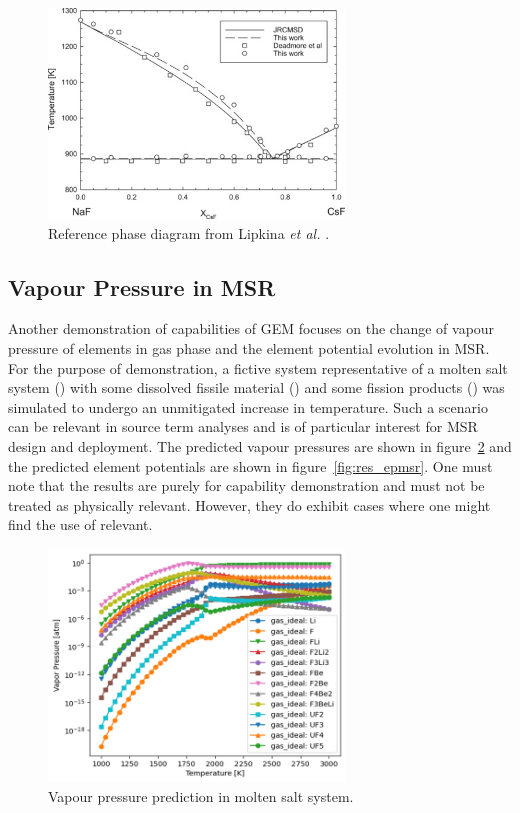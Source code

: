 \begin{figure}
         \centering
         \includegraphics[width=0.7\textwidth]{figures/chapter-7/pdo.png}
         \caption[Reference  phase  diagram from Lipkina \textit{et al.}]{Reference  phase  diagram from Lipkina \textit{et al.} \cite{Lipkina:2022aa}.}
     \label{fig:res_refdia}
\end{figure}
 
\subsection{Vapour Pressure in MSR}
    Another demonstration of capabilities of GEM focuses on the change of vapour pressure of elements in gas phase and the element potential evolution in MSR. For the purpose of demonstration, a fictive system representative of a molten salt system () with some dissolved fissile material () and some fission products () was simulated to undergo an unmitigated increase in temperature. Such a scenario can be relevant in source term analyses and is of particular interest for MSR design and deployment. The predicted vapour pressures are shown in figure~\ref{fig:res_vpmsr} and the predicted element potentials are shown in figure~\ref{fig:res_epmsr}. One must note that the results are purely for capability demonstration and must not be treated as physically relevant. However, they do exhibit cases where one might find the use of {\GEM} relevant.
  
\begin{figure}
     \centering
     \includegraphics[width=0.7\textwidth]{figures/chapter-7/vp_msr.png}
     \caption{Vapour pressure prediction in molten salt system.}
     \label{fig:res_vpmsr}
\end{figure}

